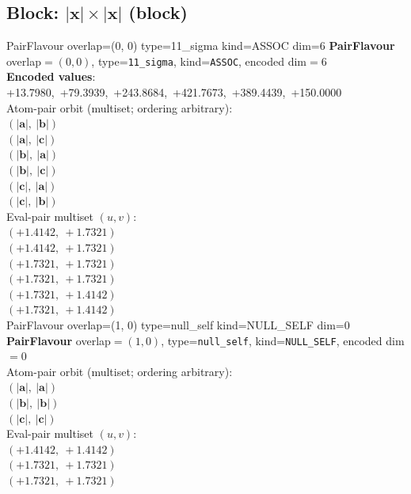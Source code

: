 \documentclass[a4paper,11pt]{article}
\newcommand{\vc}[1]{\ensuremath{\mathbf{#1}}}
\newcommand{\dnfagmiihhiejm}[1]{|\vc{#1}|}
\begin{document}
\subsection{Block: $\dnfagmiihhiejm{x} \times \dnfagmiihhiejm{x}$  (block)}
    PairFlavour  overlap=(0, 0)  type=11\_sigma  kind=ASSOC  dim=6
\textbf{PairFlavour} overlap$=(0, 0)$, type=\texttt{11\_sigma}, kind=\texttt{ASSOC}, encoded dim$=6$\\
\textbf{      Encoded values}: +13.7980,\ +79.3939,\ +243.8684,\ +421.7673,\ +389.4439,\ +150.0000\\
\quad Atom-pair orbit (multiset; ordering arbitrary):\\
$(\dnfagmiihhiejm{a},\ \dnfagmiihhiejm{b})$\\
$(\dnfagmiihhiejm{a},\ \dnfagmiihhiejm{c})$\\
$(\dnfagmiihhiejm{b},\ \dnfagmiihhiejm{a})$\\
$(\dnfagmiihhiejm{b},\ \dnfagmiihhiejm{c})$\\
$(\dnfagmiihhiejm{c},\ \dnfagmiihhiejm{a})$\\
$(\dnfagmiihhiejm{c},\ \dnfagmiihhiejm{b})$\\
\quad Eval-pair multiset $(u, v)$:\\
$(+1.4142,\ +1.7321)$\\
$(+1.4142,\ +1.7321)$\\
$(+1.7321,\ +1.7321)$\\
$(+1.7321,\ +1.7321)$\\
$(+1.7321,\ +1.4142)$\\
$(+1.7321,\ +1.4142)$\\
    PairFlavour  overlap=(1, 0)  type=null\_self  kind=NULL\_SELF  dim=0
\textbf{PairFlavour} overlap$=(1, 0)$, type=\texttt{null\_self}, kind=\texttt{NULL\_SELF}, encoded dim$=0$\\
\quad Atom-pair orbit (multiset; ordering arbitrary):\\
$(\dnfagmiihhiejm{a},\ \dnfagmiihhiejm{a})$\\
$(\dnfagmiihhiejm{b},\ \dnfagmiihhiejm{b})$\\
$(\dnfagmiihhiejm{c},\ \dnfagmiihhiejm{c})$\\
\quad Eval-pair multiset $(u, v)$:\\
$(+1.4142,\ +1.4142)$\\
$(+1.7321,\ +1.7321)$\\
$(+1.7321,\ +1.7321)$\\
\end{document}
